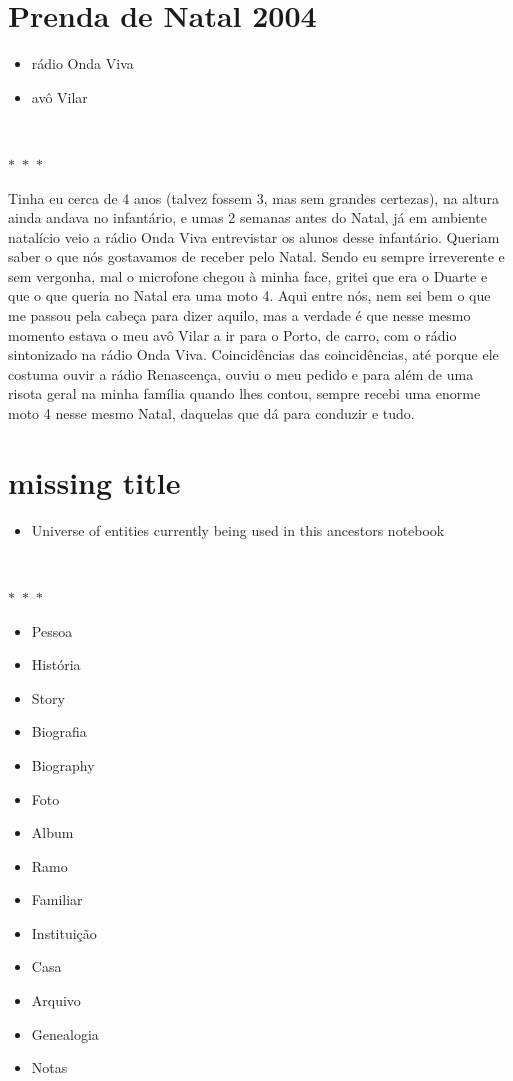 \documentclass{article}
\begin{document}
\section{Prenda de Natal 2004}
\begin{itemize}\item rádio Onda Viva
\item avô Vilar
\end{itemize}
\  
    \begin{center}
        $\ast$~$\ast$~$\ast$
    \end{center}
    Tinha eu cerca de 4 anos (talvez fossem 3, mas sem grandes certezas), na
altura ainda andava no infantário, e umas 2 semanas antes do Natal, já
em ambiente natalício veio a rádio Onda Viva entrevistar os alunos desse
infantário. Queriam saber o que nós gostavamos de receber pelo Natal.
Sendo eu sempre irreverente e sem vergonha, mal o microfone chegou à
minha face, gritei que era o Duarte e que o que queria no Natal era uma
moto 4. Aqui entre nós, nem sei bem o que me passou pela cabeça para
dizer aquilo, mas a verdade é que nesse mesmo momento estava o meu avô
Vilar a ir para o Porto, de carro, com o rádio sintonizado na rádio Onda
Viva. Coincidências das coincidências, até porque ele costuma ouvir a
rádio Renascença, ouviu o meu pedido e para além de uma risota geral na
minha família quando lhes contou, sempre recebi uma enorme moto 4 nesse
mesmo Natal, daquelas que dá para conduzir e tudo.

    	
\pagebreak\section{missing title}
\begin{itemize}\item Universe of entities currently being used in this ancestors notebook
\end{itemize}
\  
    \begin{center}
        $\ast$~$\ast$~$\ast$
    \end{center}
    \begin{itemize}
\tightlist
\item
  Pessoa
\item
  História
\item
  Story
\item
  Biografia
\item
  Biography
\item
  Foto
\item
  Album
\item
  Ramo
\item
  Familiar
\item
  Instituição
\item
  Casa
\item
  Arquivo
\item
  Genealogia
\item
  Notas
\end{itemize}

    	
\pagebreak
\end{document}
